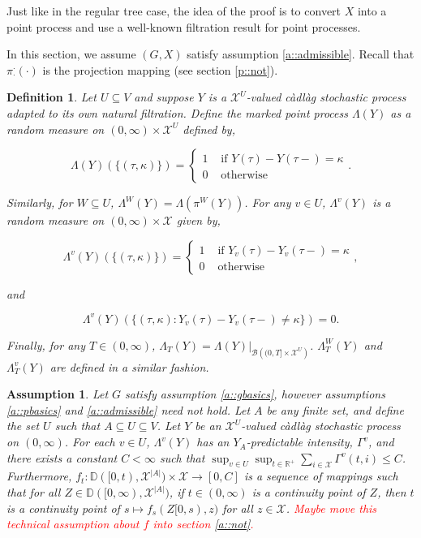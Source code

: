 \documentclass[12pt]{article}
\newcommand{\mb}{\mathbb}
\newcommand{\mc}{\mathcal}
\newcommand{\ms}{\mathscr}
\newcommand{\ra}{\rightarrow}
\newcommand{\te}{\text}
\newcommand{\tr}{\textcolor{red}}
\newcommand{\ind}{\hspace{24pt}}
\newcommand{\cad}{\mb{D}}							%
\newcommand{\sta}{\mc{X}}							%
\newcommand{\Xf}{X}									%
\newcommand{\proj}{\pi}								%
\newcommand{\vind}[1]{_{#1}}						%
\newcommand{\tme}[1]{(#1)}							%
\newcommand{\tmi}[1]{#1}							%
\newcommand{\vpara}[1]{^{#1}}						%
\newcommand{\tpara}[1]{_{#1}}						%
\newcommand{\Xg}{Y}									%
\newcommand{\pmap}{\Lambda}							%
\newcommand{\rt}{\tau}								%
\renewcommand{\mark}{\kappa}						%
\newcommand{\ratee}{\Gamma}							%
\newcommand{\Xh}{Z}									%
\newtheorem{defn}[thms]{Definition}
\newtheorem{assu}[thms]{Assumption}
\begin{document}
Just like in the regular tree case, the idea of the proof is to convert \(\Xf\) into a point process and use a well-known filtration result for point processes.

\ind In this section, we assume \((G,\Xf)\) satisfy assumption \ref{a::admissible}. Recall that \(\proj\vpara{\cdot}\tpara{\cdot}(\cdot)\) is the projection mapping (see section \ref{p::not}).

\begin{defn}
Let \(U\subseteq V\) and suppose \(\Xg\) is a \(\sta^U\)-valued c\`adl\`ag stochastic process adapted to its own natural filtration. Define the marked point process \(\pmap(\Xg)\) as a random measure on \((0,\infty) \times \sta^U\) defined by,

\[\pmap(\Xg)(\{(\rt,\mark)\}) = \begin{cases}
1 &\te{ if } \Xg\tme{\rt} - \Xg\tme{\rt-} = \mark\\
0 &\te{ otherwise}
\end{cases}.\]

Similarly, for \(W \subseteq U\), \(\pmap\vpara{W}(\Xg) = \pmap\left(\proj\vpara{W}(\Xg)\right)\). For any \(v\in U\), \(\pmap\vpara{v}(\Xg)\) is a random measure on \((0,\infty) \times \sta\) given by,

\[\pmap\vpara{v}(\Xg)(\{(\rt,\mark)\}) = \begin{cases}
1 &\te{ if } \Xg\vind{v}\tme{\rt} - \Xg\vind{v}\tme{\rt-} = \mark\\
0 &\te{ otherwise}
\end{cases},\]

and

\[\pmap\vpara{v}(\Xg)(\{(\rt,\mark): \Xg\vind{v}\tme{\rt} - \Xg\vind{v}\tme{\rt-} \neq \mark\}) = 0.\]

Finally, for any \(T\in (0,\infty)\), \(\pmap\tpara{T}(\Xg) = \pmap(\Xg)|_{\ms{B}\left((0,T]\times\sta^U\right)}\). \(\pmap\vpara{W}\tpara{T}(\Xg)\) and \(\pmap\vpara{v}\tpara{T}(\Xg)\) are defined in a similar fashion.
\label{Ex::pmap}
\end{defn}

\begin{assu}
Let \(G\) satisfy assumption \ref{a::gbasics}, however assumptions \ref{a::pbasics} and \ref{a::admissible} need not hold. Let \(A\) be any finite set, and define the set \(U\) such that \(A\subseteq U \subseteq V\). Let \(\Xg\) be an \(\sta^U\)-valued c\`adl\`ag stochastic process on \((0,\infty)\). For each \(v\in U\), \(\pmap\vpara{v}(\Xg)\) has an \(\Xg\vind{A}\)-predictable intensity, \(\ratee\vpara{v}\), and there exists a constant \(C < \infty\) such that \(\sup_{v\in U}\sup_{t\in \mb{R}^+}\sum_{i \in \sta} \ratee\vpara{v}(t,i) \leq C\). Furthermore, \(f\tpara{t}: \cad([0,t),\sta^{|A|})\times \sta\ra[0,C]\) is a sequence of mappings such that for all \(\Xh \in \cad([0,\infty),\sta^{|A|})\), if \(t\in (0,\infty)\) is a continuity point of \(\Xh\), then \(t\) is a continuity point of \(s \mapsto f\tpara{s}(\Xh\tmi{[0,s)},z)\) for all \(z \in \sta\). \tr{Maybe move this technical assumption about \(f\) into section \ref{a::not}.}
\label{Ex::Eassu}
\end{assu}
\end{document}
